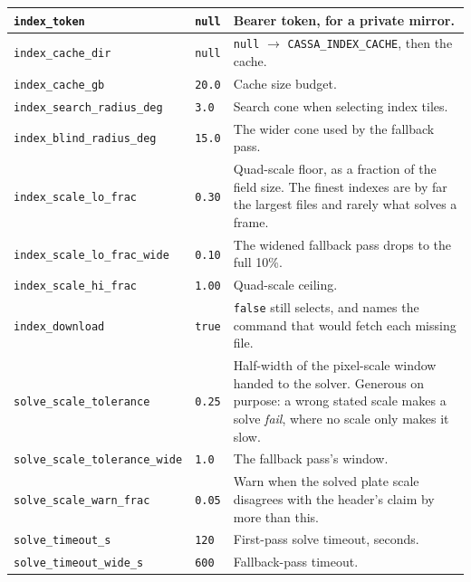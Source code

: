 \documentclass[11pt,a4paper]{article}
\begin{document}
\begin{center}
\begin{longtable}{|p{4.6cm}|p{1.9cm}|p{8.0cm}|}
\hline
\texttt{index\_token} & \texttt{null} & Bearer token, for a private mirror. \\
\hline
\texttt{index\_cache\_dir} & \texttt{null} & \texttt{null} $\rightarrow$ \texttt{CASSA\_INDEX\_CACHE}, then the cache. \\
\hline
\texttt{index\_cache\_gb} & \texttt{20.0} & Cache size budget. \\
\hline
\texttt{index\_search\_radius\_deg} & \texttt{3.0} & Search cone when selecting index tiles. \\
\hline
\texttt{index\_blind\_radius\_deg} & \texttt{15.0} & The wider cone used by the fallback pass. \\
\hline
\texttt{index\_scale\_lo\_frac} & \texttt{0.30} & Quad-scale floor, as a fraction of the field size. The finest indexes are by far the largest files and rarely what solves a frame. \\
\hline
\texttt{index\_scale\_lo\_frac\_wide} & \texttt{0.10} & The widened fallback pass drops to the full 10\%. \\
\hline
\texttt{index\_scale\_hi\_frac} & \texttt{1.00} & Quad-scale ceiling. \\
\hline
\texttt{index\_download} & \texttt{true} & \texttt{false} still selects, and names the command that would fetch each missing file. \\
\hline
\texttt{solve\_scale\_tolerance} & \texttt{0.25} & Half-width of the pixel-scale window handed to the solver. Generous on purpose: a wrong stated scale makes a solve \emph{fail}, where no scale only makes it slow. \\
\hline
\texttt{solve\_scale\_tolerance\_wide} & \texttt{1.0} & The fallback pass's window. \\
\hline
\texttt{solve\_scale\_warn\_frac} & \texttt{0.05} & Warn when the solved plate scale disagrees with the header's claim by more than this. \\
\hline
\texttt{solve\_timeout\_s} & \texttt{120} & First-pass solve timeout, seconds. \\
\hline
\texttt{solve\_timeout\_wide\_s} & \texttt{600} & Fallback-pass timeout. \\
\hline
\end{longtable}
\end{center}
\end{document}
